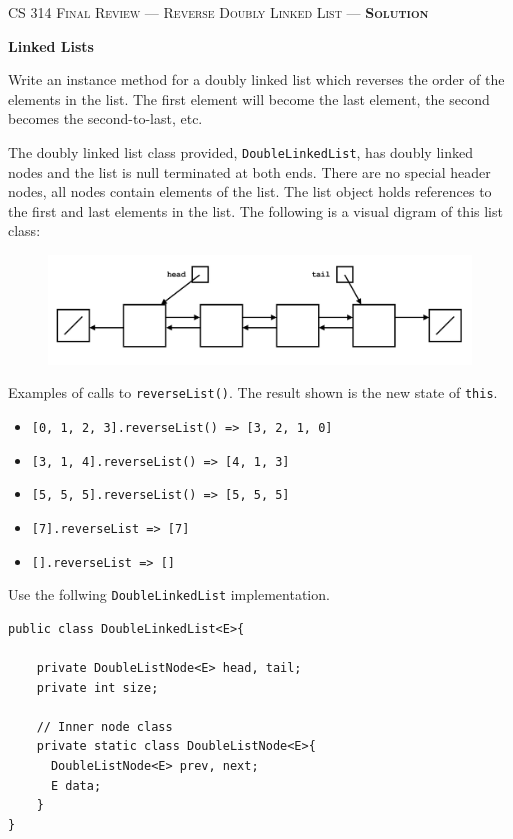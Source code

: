 \documentclass[12pt]{article}
\begin{document}
\noindent\textsc{\large CS 314 Final Review --- Reverse Doubly Linked List --- \textbf{Solution}}

\vspace{6pt}
\noindent\textbf{Linked Lists}

\vspace{2pt}
\noindent  Write an instance method for a doubly linked list which reverses the order of the elements in the list. The first element will 
become the last element, the second becomes the second-to-last, etc. 

\vspace{4pt}
\noindent The doubly linked list class provided, \texttt{DoubleLinkedList}, has doubly linked nodes and the list is null terminated at both ends.
There are no special header nodes, all nodes contain elements of the list. The list object holds references to the first
and last elements in the list. The following is a visual digram of this list class:

\begin{figure}[h!]
  \hfill
  \includegraphics[width=115mm, scale=0.5]{diagram.png}
  \hspace*{\fill}
\end{figure}

\noindent Examples of calls to \texttt{reverseList()}. The result shown is the new state of \texttt{this}.
\begin{itemize}
  \item \texttt{[0, 1, 2, 3].reverseList() => [3, 2, 1, 0]}
  \item \texttt{[3, 1, 4].reverseList() => [4, 1, 3]}
  \item \texttt{[5, 5, 5].reverseList() => [5, 5, 5]}
  \item \texttt{[7].reverseList => [7]}
  \item \texttt{[].reverseList => []}
\end{itemize}

\vspace{6pt}
\noindent Use the follwing \texttt{DoubleLinkedList} implementation.
\begin{verbatim}
public class DoubleLinkedList<E>{

    private DoubleListNode<E> head, tail;
    private int size;
   
    // Inner node class 
    private static class DoubleListNode<E>{
      DoubleListNode<E> prev, next;
      E data;
    }
}
\end{verbatim}
\end{document}
